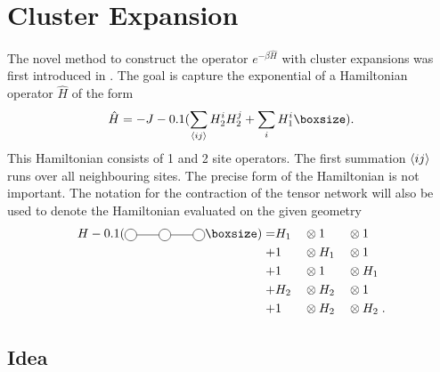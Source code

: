 \documentclass[twocolumn]{article}
\newcounter{a}
\newcounter{b}
\begin{document}

\section{Cluster Expansion}

The novel method to construct the operator $e^{-\beta \hat{H}}$ with cluster expansions was first introduced in \cite{Vanhecke2021}. The goal is capture the exponential of a Hamiltonian operator $\hat{H}$ of the form
\begin{equation}\label{H_eq}
    \hat{H} = -J \left (  \sum_{  \braket{i j }} H^i_2 H^j_2 + \sum_i H^i_1 \right ) .
\end{equation}
This Hamiltonian consists of 1 and 2 site operators. The first summation $\braket{i j }$ runs over all neighbouring sites. The precise form of the Hamiltonian is not important. The notation for the contraction of the tensor network will also be used to denote the Hamiltonian evaluated on the given geometry
\begin{alignat}{3}
    H \left( \mpob{3}{ {0,,,0}  }{}{}{}{{"",,}} \right ) = & H_1 &  & \otimes 1   &  & \otimes 1  \nonumber  \\
    +                                                      & 1   &  & \otimes H_1 &  & \otimes 1 \nonumber   \\
    +                                                      & 1   &  & \otimes 1   &  & \otimes H_1 \nonumber \\
    +                                                      & H_2 &  & \otimes H_2 &  & \otimes 1   \nonumber \\
    +                                                      & 1   &  & \otimes H_2 &  & \otimes H_2  \; .
\end{alignat}

\subsection{Idea}
\end{document}
